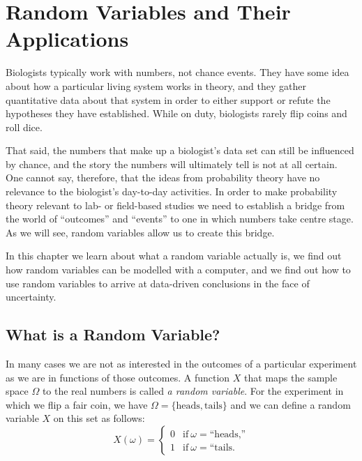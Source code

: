 \documentclass[../book.tex]{subfiles}
\begin{document}
\chapter{Random Variables and Their Applications}\label{ch:rv}

Biologists typically work with numbers, not chance events. They have some idea about how a particular living system works in theory, and they gather quantitative data about that system in order to either support or refute the hypotheses they have established. While on duty, biologists rarely flip coins and roll dice.

That said, the numbers that make up a biologist's data set can still be influenced by chance, and the story the numbers will ultimately tell is not at all certain. One cannot say, therefore, that the ideas from probability theory have no relevance to the biologist's day-to-day activities. In order to make probability theory relevant to lab- or field-based studies we need to establish a bridge from the world of ``outcomes'' and ``events'' to one in which numbers take centre stage. As we will see, random variables allow us to create this bridge.

In this chapter we learn about what a random variable actually is, we find out how random variables can be modelled with a computer, and we find out how to use random variables to arrive at data-driven conclusions in the face of uncertainty.

\section{What is a Random Variable?}

In many cases we are not as interested in the outcomes of a particular experiment as we are in functions of those outcomes. A function \(X\) that maps the sample space \(\Omega\) to the real numbers is called \emph{a random variable}. For the experiment in which we flip a fair coin, we have \(\Omega = \{ \text{heads}, \text{tails}\}\) and we can define a random variable \(X\) on this set as follows:
\begin{equation}\label{eq:rv-1}
X(\omega)
=
\begin{cases}
	0 & \text{if}\ \omega = \text{``heads,''}\\
	1 & \text{if}\ \omega = \text{``tails.}
\end{cases}
\end{equation}
\end{document}

